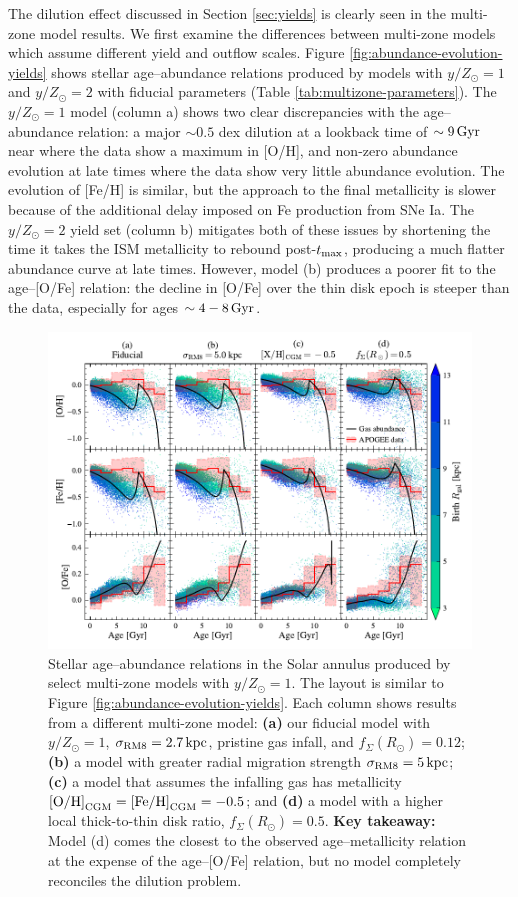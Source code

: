 \documentclass[twocolumn,twocolappendix,linenumbers]{aastex631}
\newcommand{\mathOH}{{\rm [O/H]}}
\newcommand{\mathFeH}{{\rm [Fe/H]}}
\newcommand{\yZ}[1]{$y/Z_\odot=#1$}
\newcommand{\kpc}{\,{\rm kpc}}
\begin{document}
The dilution effect discussed in Section \ref{sec:yields} is clearly seen in the multi-zone model results. We first examine the differences between multi-zone models which assume different yield and outflow scales. Figure \ref{fig:abundance-evolution-yields} shows stellar age--abundance relations produced by models with \yZ{1} and \yZ{2} with fiducial parameters (Table \ref{tab:multizone-parameters}). The \yZ{1} model (column a) shows two clear discrepancies with the \citet{leung_variational_2023} age--abundance relation: a major $\sim0.5$ dex dilution at a lookback time of $\sim9\,{\rm Gyr}$ near where the data show a maximum in [O/H], and non-zero abundance evolution at late times where the data show very little abundance evolution. The evolution of [Fe/H] is similar, but the approach to the final metallicity is slower because of the additional delay imposed on Fe production from SNe Ia. The \yZ{2} yield set (column b) mitigates both of these issues by shortening the time it takes the ISM metallicity to rebound post-$t_{\rm max}$, producing a much flatter abundance curve at late times. However, model (b) produces a poorer fit to the age--[O/Fe] relation: the decline in [O/Fe] over the thin disk epoch is steeper than the data, especially for ages $\sim4-8\,{\rm Gyr}$.

\begin{figure}
    \centering
    \includegraphics{figures/abundance_evolution_params.pdf}
    \caption{Stellar age--abundance relations in the Solar annulus produced by select multi-zone models with \yZ{1}. The layout is similar to Figure \ref{fig:abundance-evolution-yields}. Each column shows results from a different multi-zone model: {\bf (a)} our fiducial model with $y/Z_\odot=1$, $\sigma_{\rm RM8}=2.7\kpc$, pristine gas infall, and $f_\Sigma(R_\odot)=0.12$; {\bf (b)} a model with greater radial migration strength $\sigma_{\rm RM8}=5\kpc$; {\bf (c)} a model that assumes the infalling gas has metallicity $\mathOH_{\rm CGM}=\mathFeH_{\rm CGM}=-0.5$; and {\bf (d)} a model with a higher local thick-to-thin disk ratio, $f_\Sigma(R_\odot)=0.5$. {\bf Key takeaway:} Model (d) comes the closest to the observed age--metallicity relation at the expense of the age--[O/Fe] relation, but no model completely reconciles the dilution problem.}
    \label{fig:abundance-evolution-params}
\end{figure}
\end{document}
